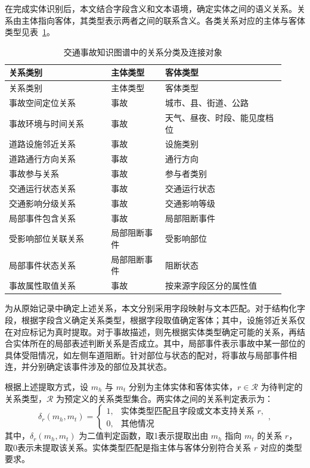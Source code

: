在完成实体识别后，本文结合字段含义和文本语境，确定实体之间的语义关系。关系由主体指向客体，其类型表示两者之间的联系含义。各类关系对应的主体与客体类型见表~\ref{tab:ch2-relation-types}。

\begingroup
\small
\begin{longtable}{@{}p{0.34\linewidth}p{0.18\linewidth}p{0.40\linewidth}@{}}
\caption{交通事故知识图谱中的关系分类及连接对象}\label{tab:ch2-relation-types}\\
\toprule
关系类别 & 主体类型 & 客体类型 \\
\midrule
\endfirsthead
\toprule
关系类别 & 主体类型 & 客体类型 \\
\midrule
\endhead
\bottomrule
\endfoot
事故空间定位关系 & 事故 & 城市、县、街道、公路 \\
事故环境与时间关系 & 事故 & 天气、昼夜、时段、能见度档位 \\
道路设施邻近关系 & 事故 & 设施类别 \\
道路通行方向关系 & 事故 & 通行方向 \\
事故参与关系 & 事故 & 参与者类别 \\
交通运行状态关系 & 事故 & 交通运行状态 \\
交通影响分级关系 & 事故 & 交通影响等级 \\
局部事件包含关系 & 事故 & 局部阻断事件 \\
受影响部位关联关系 & 局部阻断事件 & 受影响部位 \\
局部事件状态关系 & 局部阻断事件 & 阻断状态 \\
事故属性取值关系 & 事故 & 按来源字段区分的属性值 \\
\end{longtable}
\endgroup

为从原始记录中确定上述关系，本文分别采用字段映射与文本匹配。对于结构化字段，根据字段含义确定关系类型，根据字段取值确定客体；其中，设施邻近关系仅在对应标记为真时提取。对于事故描述，则先根据实体类型确定可能的关系，再结合实体所在的局部表述判断关系是否成立。其中，局部事件表示事故中某一部位的具体受阻情况，如左侧车道阻断。针对部位与状态的配对，将事故与局部事件相连，并分别确定该事件涉及的部位及其状态。

根据上述提取方式，设 $m_h$ 与 $m_t$ 分别为主体实体和客体实体，$r\in\mathcal{R}$ 为待判定的关系类型，$\mathcal{R}$ 为预定义的关系类型集合。两实体之间的关系判定表示为：
\begin{equation}
\delta_r(m_h,m_t)=
\begin{cases}
1, & \text{实体类型匹配且字段或文本支持关系 $r$},\\
0, & \text{其他情况}
\end{cases},
\label{eq:ch2-context-relations}
\end{equation}
其中，$\delta_r(m_h,m_t)$ 为二值判定函数，取1表示提取出由 $m_h$ 指向 $m_t$ 的关系 $r$，取0表示未提取该关系。实体类型匹配是指主体与客体分别符合关系 $r$ 对应的类型要求。

